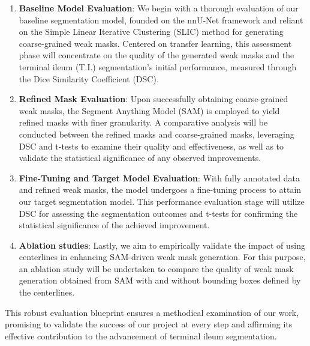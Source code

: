 \begin{enumerate}
    \item \textbf{Baseline Model Evaluation}: We begin with a thorough evaluation of our baseline segmentation model, founded on the nnU-Net framework and reliant on the Simple Linear Iterative Clustering (SLIC) method for generating coarse-grained weak masks. Centered on transfer learning, this assessment phase will concentrate on the quality of the generated weak masks and the terminal ileum (T.I.) segmentation's initial performance, measured through the Dice Similarity Coefficient (DSC).
    \item \textbf{Refined Mask Evaluation}: Upon successfully obtaining coarse-grained weak masks, the Segment Anything Model (SAM) is employed to yield refined masks with finer granularity. A comparative analysis will be conducted between the refined masks and coarse-grained masks, leveraging DSC and t-tests to examine their quality and effectiveness, as well as to validate the statistical significance of any observed improvements.
    \item \textbf{Fine-Tuning and Target Model Evaluation}: With fully annotated data and refined weak masks, the model undergoes a fine-tuning process to attain our target segmentation model. This performance evaluation stage will utilize DSC for assessing the segmentation outcomes and t-tests for confirming the statistical significance of the achieved improvement.
    \item \textbf{Ablation studies}: Lastly, we aim to empirically validate the impact of using centerlines in enhancing SAM-driven weak mask generation. For this purpose, an ablation study will be undertaken to compare the quality of weak mask generation obtained from SAM with and without bounding boxes defined by the centerlines.
\end{enumerate}
This robust evaluation blueprint ensures a methodical examination of our work, promising to validate the success of our project at every step and affirming its effective contribution to the advancement of terminal ileum segmentation.